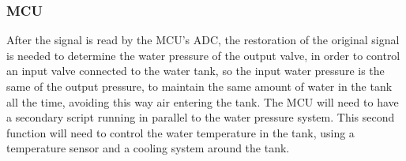\subsubsection{MCU}

After the signal is read by the MCU's ADC, the restoration of the original signal is needed to determine the water pressure of the output valve, in order to control an input valve connected to the water tank, so the input water pressure is the same of the output pressure, to maintain the same amount of water in the tank all the time, avoiding this way air entering the tank. The MCU will need to have a secondary script running in parallel to the water pressure system. This second function will need to control the water temperature in the tank, using a temperature sensor and a cooling system around the tank.

